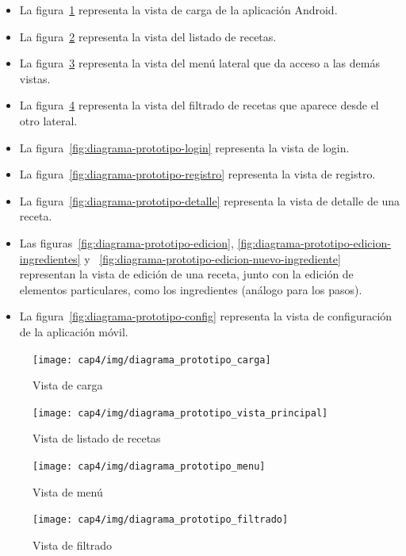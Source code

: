 \begin{itemize}
\item La figura~\ref{fig:diagrama-prototipo-carga} representa la vista de carga
de la aplicación Android.
\item La figura~\ref{fig:diagrama-prototipo-vista-principal} representa la vista
del listado de recetas.
\item La figura~\ref{fig:diagrama-prototipo-menu} representa la vista
del menú lateral que da acceso a las demás vistas.
\item La figura~\ref{fig:diagrama-prototipo-filtrado} representa la vista
del filtrado de recetas que aparece desde el otro lateral.
\item La figura~\ref{fig:diagrama-prototipo-login} representa la vista
de login.
\item La figura~\ref{fig:diagrama-prototipo-registro} representa la vista
de registro.
\item La figura~\ref{fig:diagrama-prototipo-detalle} representa la vista
de detalle de una receta.
\item Las figuras~\ref{fig:diagrama-prototipo-edicion},
\ref{fig:diagrama-prototipo-edicion-ingredientes} y
~\ref{fig:diagrama-prototipo-edicion-nuevo-ingrediente} representan la vista
de edición de una receta, junto con la edición de elementos particulares, como
los ingredientes (análogo para los pasos).
\item La figura~\ref{fig:diagrama-prototipo-config} representa la vista
de configuración de la aplicación móvil.
\end{itemize}

\begin{figure}[hp]
  \centering
  \texttt{[image: cap4/img/diagrama\_prototipo\_carga]}
  \caption{Vista de carga}
  \label{fig:diagrama-prototipo-carga}
\end{figure}

\begin{figure}[hp]
  \centering
  \texttt{[image: cap4/img/diagrama\_prototipo\_vista\_principal]}
  \caption{Vista de listado de recetas}
  \label{fig:diagrama-prototipo-vista-principal}
\end{figure}

\begin{figure}[hp]
  \centering
  \texttt{[image: cap4/img/diagrama\_prototipo\_menu]}
  \caption{Vista de menú}
  \label{fig:diagrama-prototipo-menu}
\end{figure}

\begin{figure}[hp]
  \centering
  \texttt{[image: cap4/img/diagrama\_prototipo\_filtrado]}
  \caption{Vista de filtrado}
  \label{fig:diagrama-prototipo-filtrado}
\end{figure}

